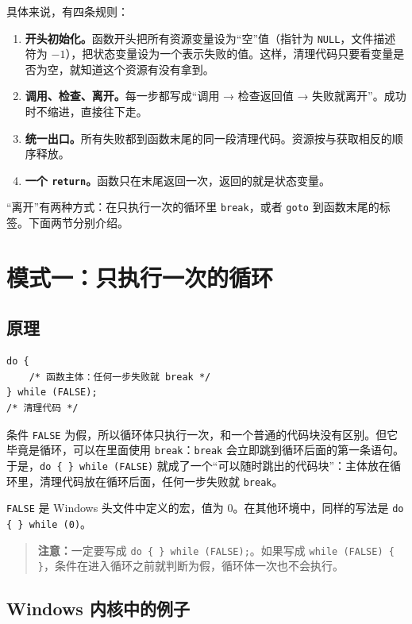 具体来说，有四条规则：
\begin{enumerate}
  \item \textbf{开头初始化。}函数开头把所有资源变量设为“空”值（指针为 \texttt{NULL}，文件描述符为 $-1$），把状态变量设为一个表示失败的值。这样，清理代码只要看变量是否为空，就知道这个资源有没有拿到。
  \item \textbf{调用、检查、离开。}每一步都写成“调用 → 检查返回值 → 失败就离开”。成功时不缩进，直接往下走。
  \item \textbf{统一出口。}所有失败都到函数末尾的同一段清理代码。资源按与获取相反的顺序释放。
  \item \textbf{一个 \texttt{return}。}函数只在末尾返回一次，返回的就是状态变量。
\end{enumerate}

“离开”有两种方式：在只执行一次的循环里 \texttt{break}，或者 \texttt{goto} 到函数末尾的标签。下面两节分别介绍。

\section{模式一：只执行一次的循环}
\label{sec:do-while}

\subsection{原理}

\begin{verbatim}
do {
    /* 函数主体：任何一步失败就 break */
} while (FALSE);
/* 清理代码 */
\end{verbatim}

条件 \texttt{FALSE} 为假，所以循环体只执行一次，和一个普通的代码块没有区别。但它毕竟是循环，可以在里面使用 \texttt{break}：\texttt{break} 会立即跳到循环后面的第一条语句。于是，\texttt{do \{ \} while (FALSE)} 就成了一个“可以随时跳出的代码块”：主体放在循环里，清理代码放在循环后面，任何一步失败就 \texttt{break}。

\texttt{FALSE} 是 Windows 头文件中定义的宏，值为 0。在其他环境中，同样的写法是 \texttt{do \{ \} while (0)}。

\begin{quote}
  \textbf{注意：}一定要写成 \texttt{do \{ \} while (FALSE);}。如果写成 \texttt{while (FALSE) \{ \}}，条件在进入循环之前就判断为假，循环体一次也不会执行。
\end{quote}

\subsection{Windows 内核中的例子}

